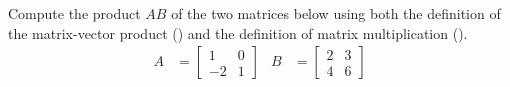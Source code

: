 Compute the product  $AB$ of the two matrices below using both the definition of the matrix-vector product () and the definition of matrix multiplication ().
%
\begin{align*}
A&=
\begin{bmatrix}
1 & 0 \\ -2 & 1
\end{bmatrix}
&
B&=
\begin{bmatrix}
2 & 3 \\ 4 & 6
\end{bmatrix}
\end{align*}
